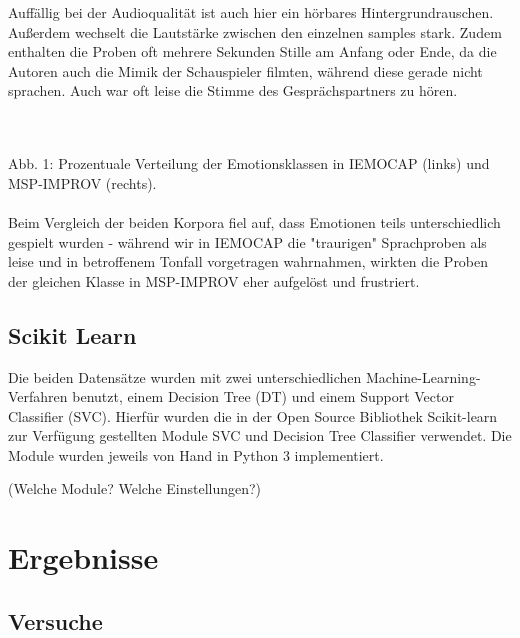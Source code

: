 \documentclass{article} %
\begin{document}
Auffällig bei der Audioqualität ist auch hier ein hörbares Hintergrundrauschen. Außerdem wechselt die Lautstärke zwischen den einzelnen samples stark. Zudem enthalten die Proben oft mehrere Sekunden Stille am Anfang oder Ende, da die Autoren auch die Mimik der Schauspieler filmten, während diese gerade nicht sprachen. Auch war oft leise die Stimme des Gesprächspartners zu hören. \\ \\
 \\
Abb. 1: Prozentuale Verteilung der Emotionsklassen in IEMOCAP (links) und MSP-IMPROV (rechts). \\ \\
Beim Vergleich der beiden Korpora fiel auf, dass Emotionen teils unterschiedlich gespielt wurden - während wir in IEMOCAP die "traurigen" Sprachproben als leise und in betroffenem Tonfall vorgetragen wahrnahmen, wirkten die Proben der gleichen Klasse in MSP-IMPROV eher aufgelöst und frustriert. 


\subsection{Scikit Learn}

Die beiden Datensätze wurden mit zwei unterschiedlichen Machine-Learning-Verfahren benutzt, einem Decision Tree (DT) und einem Support Vector Classifier (SVC). Hierfür wurden die in der Open Source Bibliothek Scikit-learn zur Verfügung gestellten Module SVC und Decision Tree Classifier verwendet. Die Module wurden jeweils von Hand in Python 3 implementiert. 

(Welche Module? Welche Einstellungen?)

\section{Ergebnisse}

\subsection{Versuche}
\end{document}
